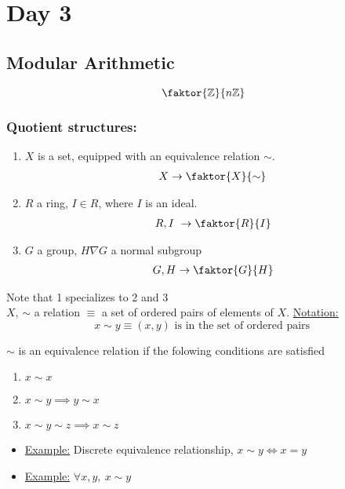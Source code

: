 \documentclass[../notes.tex]{subfiles}
\begin{document}
\section{Day 3}
\subsection{Modular Arithmetic}
\begin{center}
    \[
        \faktor{\Z}{n\Z}
    \]
\end{center}
\subsubsection{Quotient structures:}
\begin{enumerate}
    \item $X$ is a set, equipped with an equivalence relation
        $\sim$.
        \begin{align*}
            X \rightarrow \faktor{X}{\sim}
        \end{align*}
    \item $R$ a ring, $I\in R$, where $I$ is an ideal.
        \begin{align*}
            R,I\ \rightarrow \faktor{R}{I}
        \end{align*}
    \item $G$ a group, $H \nabla G$ a normal subgroup
        \begin{align*}
            G, H\rightarrow \faktor{G}{H}
        \end{align*}
\end{enumerate}
Note that 1 specializes to 2 and 3\\
\vspace{.25cm}
$X$, $\sim$ a relation $\equiv$ a set of ordered pairs
of elements of $X$.
\underline{Notation:}
\[
    x\sim y\equiv (x,y)\text{ is in the set of ordered pairs }
\]
\begin{definition}
    $\sim$ is an equivalence relation if the folowing conditions
    are satisfied
    \begin{enumerate}
        \item $x\sim x$
        \item $x\sim y \implies y\sim x$
        \item $x \sim y\sim z\implies x\sim
            z$
    \end{enumerate}
\end{definition}
\begin{itemize}
    \item \underline{Example:} Discrete equivalence relationship, 
        $x\sim y \iff x=y$
    \item \underline{Example:} $\forall x,y,\ x\sim y$
\end{itemize}
\end{document}
